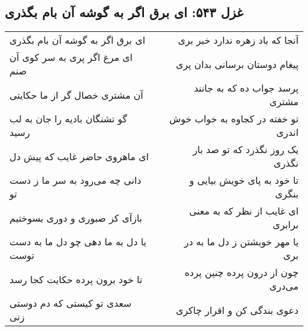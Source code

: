 \begin{center}
\section*{غزل ۵۴۳: ای برق اگر به گوشه آن بام بگذری}
\label{sec:543}
\begin{longtable}{l p{0.5cm} r}
ای برق اگر به گوشه آن بام بگذری
&&
آنجا که باد زهره ندارد خبر بری
\\
ای مرغ اگر پری به سر کوی آن صنم
&&
پیغام دوستان برسانی بدان پری
\\
آن مشتری خصال گر از ما حکایتی
&&
پرسد جواب ده که به جانند مشتری
\\
گو تشنگان بادیه را جان به لب رسید
&&
تو خفته در کجاوه به خواب خوش اندری
\\
ای ماهروی حاضر غایب که پیش دل
&&
یک روز نگذرد که تو صد بار نگذری
\\
دانی چه می‌رود به سر ما ز دست تو
&&
تا خود به پای خویش بیایی و بنگری
\\
بازآی کز صبوری و دوری بسوختیم
&&
ای غایب از نظر که به معنی برابری
\\
یا دل به ما دهی چو دل ما به دست توست
&&
یا مهر خویشتن ز دل ما به در بری
\\
تا خود برون پرده حکایت کجا رسد
&&
چون از درون پرده چنین پرده می‌دری
\\
سعدی تو کیستی که دم دوستی زنی
&&
دعوی بندگی کن و اقرار چاکری
\\
\end{longtable}
\end{center}
